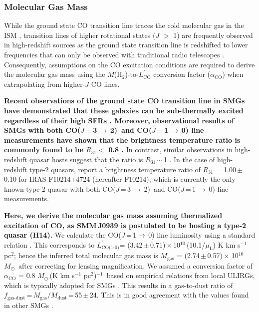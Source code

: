 \documentclass[iop, revtex4]{emulateapj}
\newcommand{\Msun}{\mbox{$M_{\odot}$}}
\newcommand{\rarr}{$\rightarrow$}
\newcommand{\CO}{\mbox{CO($J$\,=\,3\,$\rightarrow$\,2) }}
\newcommand{\Lp}{\mbox{$L^{\prime}_\textrm{CO(1-0)}$}}
\newcommand{\LpU}{\mbox{K\,\,km\,\,s$^{-1}$\,\,pc$^2$}}
\newcommand{\eg}{{\sl e.g.,~}}
\newcommand{\pmOne}{\mbox{$^{-1}$}}
\begin{document}
\subsubsection{Molecular Gas Mass} \label{sec:gas}
While the ground state CO transition line traces the cold molecular gas in the ISM
\citep*[\eg][]{Wilson70a,Downes98a}, transition lines of higher rotational states ($J$ $>$ 1) are frequently observed in high-redshift sources as the
 ground state transition line is redshifted to lower frequencies that can only be observed with traditional radio telescopes
 \citep{Carilli13a}. Consequently, assumptions on the CO excitation conditions are required to derive the molecular gas mass using the $M$(H$_\textrm{2}$)-to-$L^{\prime}_\textrm{CO}$
 conversion factor ($\alpha_\mathrm{CO}$) when extrapolating from higher-$J$ CO lines. \par
{\bf Recent observations of the ground state CO transition line in SMGs have demonstrated that these galaxies can be sub-thermally excited regardless of their high SFRs
   \citep{Harris10a,Riechers11c,Riechers11d,Ivison11a}. 
 Moreover, observational results of SMGs with both \CO and CO($J$\,=\,1\,\rarr\,0) line measurements have shown that the
   brightness temperature ratio is commonly found to be $R_\textrm{31}<$ 0.8 \citep
   {Harris10a,Carilli10a,Swinbank2010a,Ivison10d,Ivison11a,Riechers11d}.} In contrast, similar observations in high-redshift quasar hosts suggest that the ratio
   is $R_\textrm{31}$\,$\sim$\,1 \citep{Riechers06a, Riechers11a}. In the case of high-redshift type-2 quasars, \citet{Riechers11a} report a brightness temperature ratio of $R_\textrm{31}$ = 1.00\,$\pm$\,0.10 for IRAS F10214+4724 (hereafter F10214), which is currently the only known type-2 quasar with both \CO and CO($J$\,=\,1\,\rarr\,0) line measurements. \par
{\bf Here, we derive the molecular gas mass
assuming thermalized excitation of CO, as SMM\,J0939 is
postulated to be hosting a type-2 quasar (H14).}
We calculate the CO($J$\,=\,1\rarr\,0) line luminosity using a standard relation
\citep[\eg][]{Solomon05a}. This corresponds to \Lp = (3.42\,$\pm$\,0.71)\,$\times$\,10$^{10}$\,(10.1/$\mu_\textrm{L}$) \LpU; hence the inferred total molecular gas mass is $M_\textrm{gas}$ = (2.74\,$\pm$\,0.57)\,$\times$\,\,10$^{10}$\,\Msun\, after correcting for lensing magnification. We assumed a conversion factor of $\alpha_\textrm{CO}$ = 0.8\,\,\Msun\,(\LpU)\pmOne\ based on empirical relations from local ULIRGs, which is typically
adopted for SMGs \citep[\eg][]{Tacconi06a,Tacconi08a,Bothwell13a}.
This results in a gas-to-dust
ratio of $f_\textrm{gas-dust}$\,=\,$M_\textrm{gas}/M_\textrm{dust}$\,=\,55\,$\pm$\,24. 
This is in good agreement  with the
values found in other SMGs \citep{Coppin08a,Micha10a,Riechers11c}.
\end{document}
